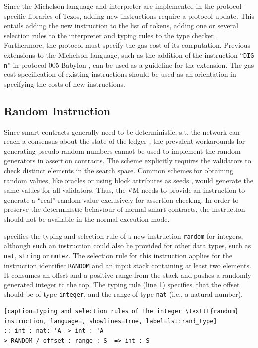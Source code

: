 Since the Michelson language and interpreter are implemented in the protocol-specific libraries of Tezos, adding new instructions require a protocol update. This entails adding the new instruction to the list of tokens, adding one or several selection rules to the interpreter and typing rules to the type checker \cite{tezos_repo}. Furthermore, the protocol must specify the gas cost of its computation. Previous extensions to the Michelson language, such as the addition of the instruction ``\texttt{DIG n}'' in protocol 005 Babylon \cite{tezos_michelson_ext}, can be used as a guideline for the extension. The gas cost specification of existing instructions should be used as an orientation in specifying the costs of new instructions.

\subsection{Random Instruction}\label{sec:random}
Since smart contracts generally need to be deterministic, s.t. the network can reach a consensus about the state of the ledger \cite{chatterjee_probabilistic_2019}, the prevalent workarounds for generating pseudo-random numbers cannot be used to implement the random generators in assertion contracts. The scheme explicitly requires the validators to check distinct elements in the search space. Common schemes for obtaining random values, like oracles or using block attributes as seeds \cite{chatterjee_probabilistic_2019}, would generate the same values for all validators. Thus, the VM needs to provide an instruction to generate a ``real'' random value exclusively for assertion checking. In order to preserve the deterministic behaviour of normal smart contracts, the instruction should not be available in the normal execution mode.

 specifies the typing and selection rule of a new instruction \texttt{random} for integers, although such an instruction could also be provided for other data types, such as \texttt{nat}, \texttt{string} or \texttt{mutez}. The selection rule for this instruction applies for the instruction identifier \texttt{RANDOM} and an input stack containing at least two elements. It consumes an offset and a positive range from the stack and pushes a randomly generated integer to the top. The typing rule (line 1) specifies, that the offset should be of type \texttt{integer}, and the range of type \texttt{nat} (i.e., a natural number).
\lstset{upquote=true}
\begin{lstlisting}[caption=Typing and selection rules of the integer \texttt{random} instruction, language=, showlines=true, label=lst:rand_type]
:: int : nat: 'A -> int : 'A
> RANDOM / offset : range : S  => int : S
\end{lstlisting}

